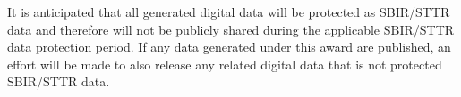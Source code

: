 \documentclass[times,12pt,portrait]{article} %
\date{}
\begin{document}


It is anticipated that all generated digital data will be protected as
SBIR/STTR data and therefore will not be publicly shared during the
applicable SBIR/STTR data protection period. If any data generated
under this award are published, an effort will be made to also release
any related digital data that is not protected SBIR/STTR data.
\end{document}
